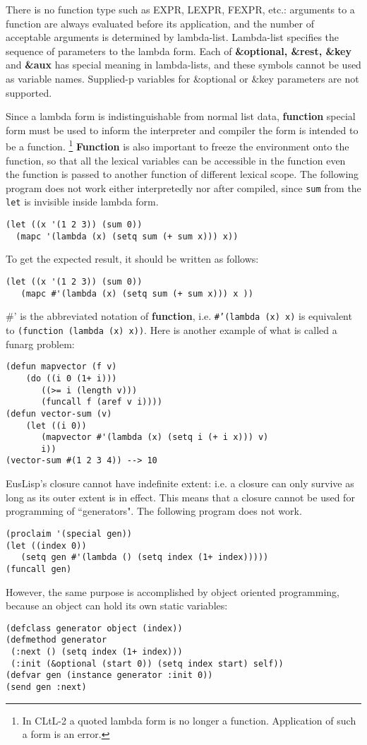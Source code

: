 There is no function type such as EXPR, LEXPR, FEXPR, etc.:
arguments to a function are always evaluated before its application,
and the number of acceptable arguments is determined by lambda-list.
Lambda-list specifies the sequence of parameters to the lambda form.
Each of {\bf \&optional, \&rest, \&key } and {\bf \&aux} has special
meaning in lambda-lists, and these symbols cannot be used as variable
names.
Supplied-p variables for \&optional or \&key parameters are not supported.

Since a lambda form is indistinguishable from normal list data,
{\bf function} special form must be used to inform the interpreter and
compiler the form is intended to be a function.
\footnote{In CLtL-2 a quoted lambda form is no longer a function.
Application of such a form is an error.}
{\bf Function} is also important to freeze the environment onto the function,
so that all the lexical variables can be accessible in the function
even the function is passed to another function of different lexical scope.
The following program does not work either interpretedly nor after compiled,
since {\tt sum} from the {\tt let} is invisible  inside lambda form.

\begin{verbatim}
(let ((x '(1 2 3)) (sum 0))
  (mapc '(lambda (x) (setq sum (+ sum x))) x))
\end{verbatim}

To get the expected result, it should be written as follows:
\begin{verbatim}
(let ((x '(1 2 3)) (sum 0))
   (mapc #'(lambda (x) (setq sum (+ sum x))) x ))
\end{verbatim}

\#' is the abbreviated notation of {\bf function},
i.e. {\tt \#'(lambda (x) x)} is equivalent to
{\tt (function (lambda (x) x))}.
Here is another example of what is called a funarg problem:

\begin{verbatim}
(defun mapvector (f v)
    (do ((i 0 (1+ i)))
       ((>= i (length v)))
       (funcall f (aref v i))))
(defun vector-sum (v)
    (let ((i 0))
       (mapvector #'(lambda (x) (setq i (+ i x))) v)
       i))
(vector-sum #(1 2 3 4)) --> 10 
\end{verbatim}

EusLisp's closure cannot have indefinite extent:
i.e. a closure can only survive as long as its outer extent is in effect.
This means that a closure cannot be used for programming of ``generators".
The following program does not work.

\begin{verbatim}
(proclaim '(special gen))
(let ((index 0))
   (setq gen #'(lambda () (setq index (1+ index)))))
(funcall gen)
\end{verbatim}

However, the same purpose is accomplished by object oriented programming,
because an object can hold its own static variables:
\begin{verbatim}
(defclass generator object (index))
(defmethod generator
 (:next () (setq index (1+ index)))
 (:init (&optional (start 0)) (setq index start) self))
(defvar gen (instance generator :init 0))
(send gen :next)
\end{verbatim}
\newpage
